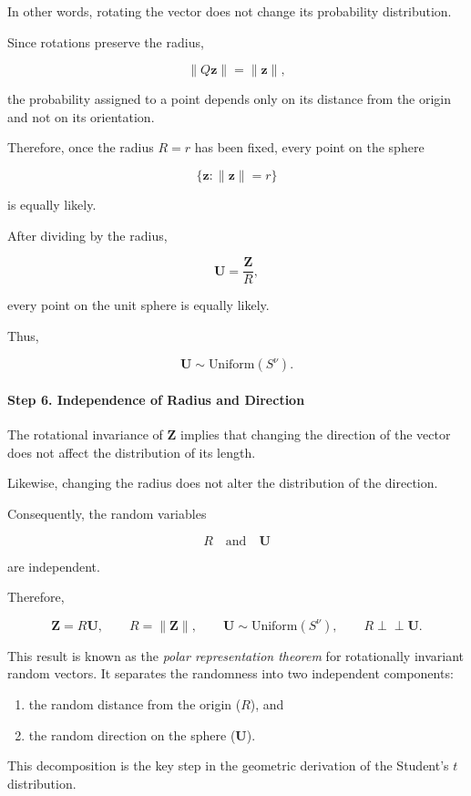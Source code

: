 \documentclass[11pt]{article}
\begin{document}
\begin{mdframed}[
		linewidth=0.8pt,
		roundcorner=6pt,
		backgroundcolor=gray!5,
		linecolor=gray!60,
		innertopmargin=10pt,
		innerbottommargin=10pt,
		innerleftmargin=10pt,
		innerrightmargin=10pt
		]
		In other words, rotating the vector does not change its probability
		distribution.
		
		Since rotations preserve the radius,
		
		\[
		\|Q\mathbf z\|
		=
		\|\mathbf z\|,
		\]
		
		the probability assigned to a point depends only on its distance from the
		origin and not on its orientation.
		
		Therefore, once the radius $R=r$ has been fixed, every point on the sphere
		
		\[
		\{\mathbf z:\|\mathbf z\|=r\}
		\]
		
		is equally likely.
		
		After dividing by the radius,
		
		\[
		\mathbf U=\frac{\mathbf Z}{R},
		\]
		
		every point on the unit sphere is equally likely.
		
		Thus,
		
		\[
		\boxed{
			\mathbf U
			\sim
			\text{Uniform}(S^\nu).
		}
		\]
		
		\vspace{0.3cm}
		
		\paragraph{Step 6. Independence of Radius and Direction}
		
		The rotational invariance of $\mathbf Z$ implies that changing the direction
		of the vector does not affect the distribution of its length.
		
		Likewise, changing the radius does not alter the distribution of the
		direction.
		
		Consequently, the random variables
		
		\[
		R
		\quad\text{and}\quad
		\mathbf U
		\]
		
		are independent.
		
		Therefore,
		
		\[
		\boxed{
			\mathbf Z
			=
			R\mathbf U,
			\qquad
			R=\|\mathbf Z\|,
			\qquad
			\mathbf U\sim\text{Uniform}(S^\nu),
			\qquad
			R\perp\!\!\!\perp\mathbf U.
		}
		\]
		
		This result is known as the \emph{polar representation theorem} for
		rotationally invariant random vectors. It separates the randomness into two
		independent components:
		
		\begin{enumerate}
			\item the random distance from the origin ($R$), and
			\item the random direction on the sphere ($\mathbf U$).
		\end{enumerate}
		
		This decomposition is the key step in the geometric derivation of the
		Student's $t$ distribution.
		
	\end{mdframed}
	
\end{document}
